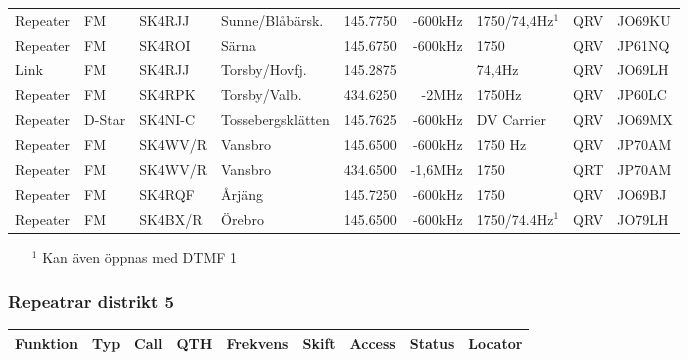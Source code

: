 \begin{landscape}
\begin{longtable}{llllrrlcl}
Repeater & FM     & SK4RJJ   & Sunne/Blåbärsk.     & 145.7750 & -600kHz    & 1750/74,4Hz$^1$ & QRV  & JO69KU \\
Repeater & FM     & SK4ROI   & Särna               & 145.6750 & -600kHz    & 1750            & QRV  & JP61NQ \\
Link     & FM     & SK4RJJ   & Torsby/Hovfj.       & 145.2875 &            & 74,4Hz          & QRV  & JO69LH \\
Repeater & FM     & SK4RPK   & Torsby/Valb.        & 434.6250 & -2MHz      & 1750Hz          & QRV  & JP60LC \\
Repeater & D-Star & SK4NI-C  & Tossebergsklätten   & 145.7625 & -600kHz    & DV Carrier      & QRV  & JO69MX \\
Repeater & FM     & SK4WV/R  & Vansbro             & 145.6500 & -600kHz    & 1750 Hz         & QRV  & JP70AM \\
Repeater & FM     & SK4WV/R  & Vansbro             & 434.6500 & -1,6MHz    & 1750            & QRT  & JP70AM \\
Repeater & FM     & SK4RQF   & Årjäng              & 145.7250 & -600kHz    & 1750            & QRV  & JO69BJ \\
Repeater & FM     & SK4BX/R  & Örebro              & 145.6500 & -600kHz    & 1750/74.4Hz$^1$ & QRV  & JO79LH

\end{longtable}
\begin{itemize}
\item[$^1$] Kan även öppnas med DTMF 1
\end{itemize}
\subsubsection{Repeatrar distrikt 5}
\begin{longtable}{llllrrlcl}

\textbf{Funktion} & \textbf{Typ}    & \textbf{Call}   & \textbf{QTH} & \textbf{Frekvens} & 
\textbf{Skift}    & \textbf{Access} & \textbf{Status} & \textbf{Locator} \\ \hline \endhead


\end{longtable}
\end{landscape}
